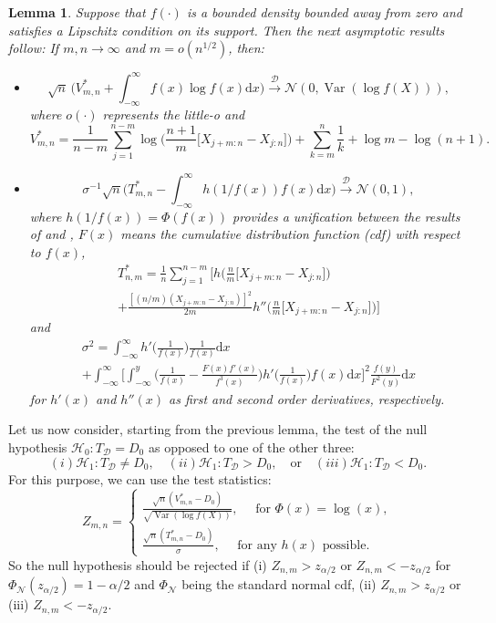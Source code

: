 \documentclass[12pt]{article}
\newtheorem{lemma}[prop]{Lemma}
\begin{document}
\begin{lemma}
Suppose that $f(\cdot)$ is a bounded density bounded away from zero and satisfies a Lipschitz condition on its support.
Then the next asymptotic results follow: If $m,n\rightarrow \infty$ and $m=o(n^{1/2})$, then:
\begin{itemize}
\item[(i)]
$$
\sqrt{n}\,\Big(V^*_{m,n}+\int_{-\infty}^\infty f(x)\log f(x) \mathrm{d}x\Big)
\xrightarrow[]{\mathcal{D}}
\mathcal{N}(0,\operatorname{Var}(\log f(X))),
$$
where $o(\cdot)$ represents the little-o and
$$
V^*_{m,n}=\frac{1}{n-m} \sum_{j=1}^{n-m} \log\Big(\frac{n+1}{m}\Big[X_{j+m:n}-X_{j:n}\Big]\Big)+\sum_{k=m}^n{\frac 1k}+\log m -\log(n+1).
$$
\item[(ii)]
$$
\sigma^{-1}\sqrt{n}\Big(T_{m,n}^*-\int_{-\infty}^{\infty}h(1/f(x))f(x)\mathrm{d}x\Big)
\xrightarrow[]{\mathcal{D}}
\mathcal{N}(0,1),
$$
where $h(1/f(x))=\Phi(f(x))$ provides a unification between the results of \citet{Khashimov1990} and \citet{Bert1992}, $F(x)$ means the cumulative distribution function (cdf) with respect to $f(x)$,
\begin{multline*}
T_{n,m}^*= {\frac 1n}\sum_{j=1}^{n-m}\Bigg[h\Big({\frac nm}\Big[X_{j+m:n}-X_{j:n}\Big]\Big)\\+\frac{[(n/m)(X_{j+m:n}-X_{j:n})]^2}{2m}h''\Big({\frac nm}\Big[X_{j+m:n}-X_{j:n}\Big]\Big)\Bigg]
\end{multline*}
and
\begin{multline*}
\sigma^2=\int_{-\infty}^{\infty}h'\Big(\frac{1}{f(x)}\Big)\frac{1}{f(x)}\mathrm{d}x\\
+\int_{-\infty}^\infty \Big[\int_{-\infty}^y\Big(\frac{1}{f(x)}-\frac{F(x)f'(x)}{f^3(x)}\Big)h'\Big(\frac{1}{f(x)}\Big)f(x)\mathrm{d}x\Big]^2\frac{f(y)}{F^2(y)}\mathrm{d}x
\end{multline*}
for $h'(x)$ and $h''(x)$ as first and second order derivatives, respectively.
\end{itemize}
\end{lemma} 


Let us now consider, starting from the previous lemma, the test of the null hypothesis $\mathcal{H}_0: T_{\mathcal{D}}=D_0$ as opposed to one of the other three:
$$
(i) \mathcal{H}_1:T_{\mathcal{D}}\neq D_0, \quad (ii) \mathcal{H}_1:T_{\mathcal{D}}> D_0, \quad\text{or}\quad (iii) \mathcal{H}_1:T_{\mathcal{D}}< D_0. 
$$
For this purpose, we can use the test statistics:
$$
Z_{m,n} = 
\left\{
\begin{array}{ll}
\frac{\sqrt{n}(V^*_{m,n}-D_0)}{\sqrt{\operatorname{Var}(\log f(X))}}, 
\quad \text{ for }\Phi(x)=\log(x),\\
\frac{\sqrt{n}(T^*_{m,n}-D_0)}{\sigma},
\quad \text{ for any }h(x)\text{ possible}. 
\end{array}
\right.
$$
So the null hypothesis should be rejected if (i) $Z_{n,m} > z_{\alpha/2}$ or $Z_{n,m} < - z_{\alpha/2}$ for $\Phi_{\mathcal N}(z_{\alpha/2})=1-\alpha/2$ and $\Phi_{\mathcal N}$ being the standard normal cdf, (ii) $Z_{n,m} > z_{\alpha/2}$ or (iii) $Z_{n,m} < - z_{\alpha/2}$.  
\end{document}
